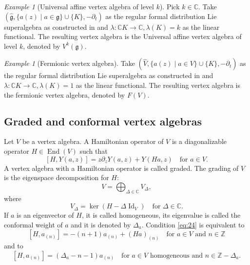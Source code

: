 \documentclass[a4paper, 12pt, reqno]{amsart}
\theoremstyle{remark}
\newtheorem{example}[theorem]{Example}
\numberwithin{equation}{subsection}
\DeclareMathOperator{\Id}{Id}
\DeclareMathOperator{\End}{End}
\begin{document}
\begin{example}[Universal affine vertex algebra of level $k$]
  \label{exa:6}
  Pick $k \in \mathbb{C}$.
  Take $(\hat{\mathfrak{g}}, \{a(z) \mid a \in \mathfrak{g}\} \cup \{K\}, -\partial_t)$ as the regular formal distribution Lie superalgebra as constructed in  and $\lambda: \mathbb{C}K \to \mathbb{C}, \lambda(K) = k$ as the linear functional.
  The resulting vertex algebra is the Universal affine vertex algebra of level $k$, denoted by $V^k(\mathfrak{g})$.
\end{example}

\begin{example}[Fermionic vertex algebra]
  \label{exa:7}
  Take $(\widehat{V}, \{a(z) \mid a \in V\} \cup \{K\}, -\partial_t)$ as the regular formal distribution Lie superalgebra as constructed in  and $\lambda: \mathbb{C}K \to \mathbb{C}, \lambda(K) = 1$ as the linear functional.
  The resulting vertex algebra is the fermionic vertex algebra, denoted by $F(V)$.
\end{example}

\subsection{Graded and conformal vertex algebras}
\label{sec:grad-conf-vert}

Let $V$ be a vertex algebra.
A Hamiltonian operator of $V$ is a diagonalizable operator $H \in \End(V)$ such that
\begin{equation}
  \label{eq:24}
  [H, Y(a, z)] = z\partial_zY(a, z) + Y(Ha, z) \quad \text{for }a \in V.
\end{equation}
A vertex algebra with a Hamiltonian operator is called graded.
The grading of $V$ is the eigenspace decomposition for $H$:
\begin{equation*}
  V = \bigoplus_{\Delta \in \mathbb{C}}V_{\Delta},
\end{equation*}
where
\begin{equation*}
  V_{\Delta} = \ker(H - \Delta\Id_V) \quad \text{for }\Delta \in \mathbb{C}.
\end{equation*}
If $a$ is an eigenvector of $H$, it is called homogeneous, its eigenvalue is called the conformal weight of $a$ and it is denoted by $\Delta_a$.
Condition \eqref{eq:24} is equivalent to
\begin{equation}
  \label{eq:25}
  [H,a_{(n)}] = -(n + 1)a_{(n)} + (Ha)_{(n)} \quad \text{for }a \in V\text{ and }n \in \mathbb{Z}
\end{equation}
and to
\begin{equation}
  \label{eq:26}
  [H, a_{(n)}] = (\Delta_a - n - 1)a_{(n)} \quad \text{for }a \in V\text{ homogeneous and }n \in \mathbb{Z} - \Delta_a.
\end{equation}
\end{document}
